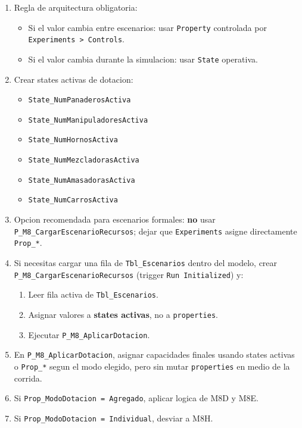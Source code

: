 \documentclass[11pt]{article}
\newcommand{\simio}[1]{\texttt{#1}}
\newcommand{\tabla}[1]{\texttt{#1}}
\newcommand{\state}[1]{\texttt{#1}}
\newcommand{\proc}[1]{\texttt{#1}}
\begin{document}
\begin{enumerate}
  \item Regla de arquitectura obligatoria:
  \begin{itemize}
    \item Si el valor cambia entre escenarios: usar \simio{Property} controlada por \simio{Experiments > Controls}.
    \item Si el valor cambia durante la simulacion: usar \simio{State} operativa.
  \end{itemize}
  \item Crear states activas de dotacion:
  \begin{itemize}
    \item \state{State\_NumPanaderosActiva}
    \item \state{State\_NumManipuladoresActiva}
    \item \state{State\_NumHornosActiva}
    \item \state{State\_NumMezcladorasActiva}
    \item \state{State\_NumAmasadorasActiva}
    \item \state{State\_NumCarrosActiva}
  \end{itemize}
  \item Opcion recomendada para escenarios formales: \textbf{no} usar \proc{P\_M8\_CargarEscenarioRecursos}; dejar que \simio{Experiments} asigne directamente \state{Prop\_*}.
  \item Si necesitas cargar una fila de \tabla{Tbl\_Escenarios} dentro del modelo, crear \proc{P\_M8\_CargarEscenarioRecursos} (trigger \simio{Run Initialized}) y:
  \begin{enumerate}
    \item Leer fila activa de \tabla{Tbl\_Escenarios}.
    \item Asignar valores a \textbf{states activas}, no a \simio{properties}.
    \item Ejecutar \proc{P\_M8\_AplicarDotacion}.
  \end{enumerate}
  \item En \proc{P\_M8\_AplicarDotacion}, asignar capacidades finales usando states activas o \simio{Prop\_*} segun el modo elegido, pero sin mutar \simio{properties} en medio de la corrida.
  \item Si \state{Prop\_ModoDotacion = Agregado}, aplicar logica de M8D y M8E.
  \item Si \state{Prop\_ModoDotacion = Individual}, desviar a M8H.
\end{enumerate}
\end{document}
